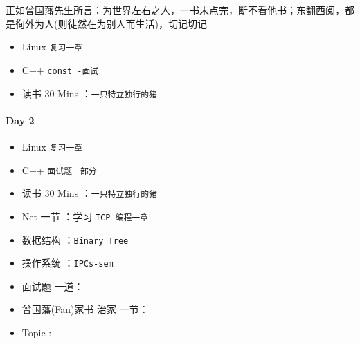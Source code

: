 \documentclass[UTF8,a4paper,8pt]{ctexart}
\begin{document}
	 	 正如曾国藩先生所言：为世界左右之人，一书未点完，断不看他书；东翻西阅，都是徇外为人(则徒然在为别人而生活)，切记切记
	 	 \begin{itemize}[itemindent = 1em]
	 	 	\renewcommand\labelitemi{\makebox[0pt][l]{$\square$}\hspace{1em}} 
	 	 	\renewcommand\labelitemi{\makebox[0pt][l]{$\square$}\raisebox{.15ex}{\hspace{0.1em}$\checkmark$}}	 	
	 	 	\item   Linux \verb|复习一章|
	 	 	\item   C++   \verb|const -面试|
	 	 	
	 	 	\item   读书  30 Mins	：\verb|一只特立独行的猪|
	 	 \end{itemize}
	 	 
 	 \paragraph{Day 2       \quad     }
	 	 \begin{itemize}[itemindent = 1em]
	 	 	\renewcommand\labelitemi{\makebox[0pt][l]{$\square$}\hspace{1em}} 
	 	 	\renewcommand\labelitemi{\makebox[0pt][l]{$\square$}\raisebox{.15ex}{\hspace{0.1em}$\checkmark$}}	 	
	 	 	\item   Linux \verb|复习一章|
	 	 	\item   C++   \verb|面试题一部分|
	 	 	
	 	 	\item   读书  30 Mins	：\verb|一只特立独行的猪|
	 	 	\item   Net 一节 ：学习 \verb|TCP 编程一章|	
	 	 	
	 	 	\renewcommand\labelitemi{\makebox[0pt][l]{$\square$}\hspace{1em}} 
	 	 	\item   数据结构 ：\verb|Binary Tree| 
	 	 	\item   操作系统 ：\verb|IPCs-sem|
	 	 	\item   面试题 一道：
	 	 	
	 	 	\renewcommand\labelitemi{\makebox[0pt][l]{$\square$}\raisebox{.15ex}{\hspace{0.1em}$\checkmark$}}
	 	 	\item   曾国藩(Fan)家书 治家 一节：
	 	 	\item   Topic :
	 	 \end{itemize}
\end{document}
